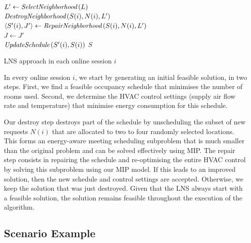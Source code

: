 \begin{algorithm}[ht!]
\small
{}
 \Indm
 \Initialize{}
 \;
 \Indm
 \Algorithm{}
 \Indp
 {
	$L' \gets \emph{SelectNeighborhood}\left(L\right)$ \\
	$\emph{DestroyNeighborhood}\left(S(i), N(i), L' \right)$ \\
	$\langle S'(i), J' \rangle \gets \emph{RepairNeighborhood}\left(S(i), N(i), L' \right)$\\
	{
		$J \gets J' $\\
		$\emph{UpdateSchedule}\left(S'(i), S(i) \right)$
	}
 }
 \Return $S$
 \caption{LNS approach in each online session $i$}
 \label{alg:online:lns}
\end{algorithm}

In every online session $i$, we start by generating an initial feasible solution, in two steps. First, we find a feasible occupancy schedule that minimises the number of rooms used. Second, we determine the HVAC control settings (supply air flow rate and temperature) that minimise energy consumption for this schedule.

Our destroy step destroys part of the schedule by unscheduling the subset of new requests $N(i)$ that are allocated to two to four randomly selected locations. This forms an energy-aware meeting scheduling subproblem that is much smaller than the original problem and can be solved effectively using MIP. The repair step consists in repairing the schedule and re-optimising the entire HVAC control by solving this subproblem using our MIP model. If this leads to an improved solution, then the new schedule and control settings are accepted. Otherwise, we keep the solution that was just destroyed. Given that the LNS always start with a feasible solution, the solution remains feasible throughout the execution of the algorithm.


\subsection{Scenario Example}


